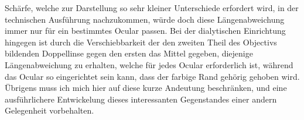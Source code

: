Schärfe, welche zur Darstellung so sehr kleiner Unterschiede erfordert wird, in der technischen Ausführung nachzukommen, würde doch diese Längenabweichung immer nur für ein bestimmtes Ocular passen. Bei der dialytischen Einrichtung hingegen ist durch die Verschiebbarkeit der den zweiten Theil des Objectivs bildenden Doppellinse gegen den ersten das Mittel gegeben, diejenige Längenabweichung zu erhalten, welche für jedes Ocular erforderlich ist, während das Ocular so eingerichtet sein kann, dass der farbige Rand gehörig gehoben wird. Übrigens muss ich mich hier auf diese kurze Andeutung beschränken, und eine ausführlichere Entwickelung dieses interessanten Gegenstandes einer andern Gelegenheit vorbehalten.
